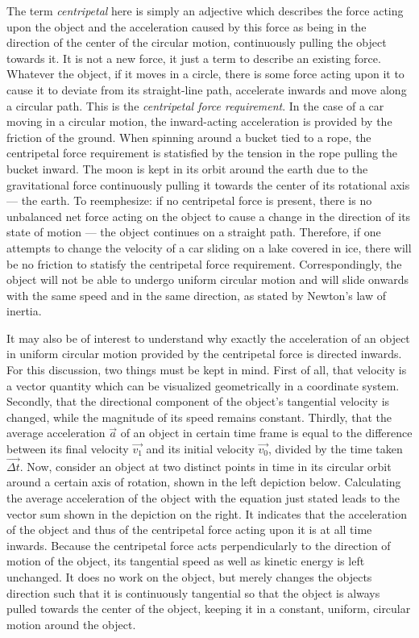 The term \emph{centripetal} here is simply an adjective which describes the force acting upon the object and the acceleration caused by this force as being in the direction of the center of the circular motion, continuously pulling the object towards it. It is not a new force, it just a term to describe an existing force. Whatever the object, if it moves in a circle, there is some force acting upon it to cause it to deviate from its straight-line path, accelerate inwards and move along a circular path. This is the \emph{centripetal force requirement}. In the case of a car moving in a circular motion, the inward-acting acceleration is provided by the friction of the ground. When spinning around a bucket tied to a rope, the centripetal force requirement is statisfied by the tension in the rope pulling the bucket inward. The moon is kept in its orbit around the earth due to the gravitational force continuously pulling it towards the center of its rotational axis --- the earth. To reemphesize: if no centripetal force is present, there is no unbalanced net force acting on the object to cause a change in the direction of its state of motion --- the object continues on a straight path. Therefore, if one attempts to change the velocity of a car sliding on a lake covered in ice, there will be no friction to statisfy the centripetal force requirement. Correspondingly, the object will not be able to undergo uniform circular motion and will slide onwards with the same speed and in the same direction, as stated by Newton's law of inertia. 

It may also be of interest to understand why exactly the acceleration of an object in uniform circular motion provided by the centripetal force is directed inwards. For this discussion, two things must be kept in mind. First of all, that velocity is a vector quantity which can be visualized geometrically in a coordinate system. Secondly, that the directional component of the object's tangential velocity is changed, while the magnitude of its speed remains constant. Thirdly, that the average acceleration $\vec{a}$ of an object in certain time frame is equal to the difference between its final velocity $\vec{v_1}$ and its initial velocity $\vec{v_0}$, divided by the time taken $\vec{\Delta t}$. Now, consider an object at two distinct points in time in its circular orbit around a certain axis of rotation, shown in the left depiction below. Calculating the average acceleration of the object with the equation just stated leads to the vector sum shown in the depiction on the right. It indicates that the acceleration of the object and thus of the centripetal force acting upon it is at all time inwards. Because the centripetal force acts perpendicularly to the direction of motion of the object, its tangential speed as well as kinetic energy is left unchanged. It does no work on the object, but merely changes the objects direction such that it is continuously tangential so that the object is always pulled towards the center of the object, keeping it in a constant, uniform, circular motion around the object.

